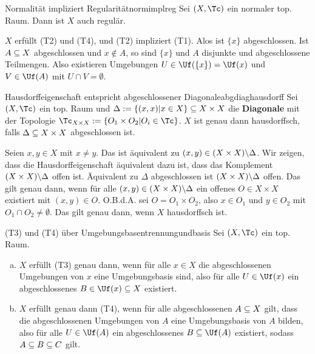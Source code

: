 \begin{satz}{Normalität impliziert Regularität}{normimplreg}
Sei $(X, \Tc)$ ein normaler top. Raum. Dann ist $X$ auch regulär.
\end{satz}
\begin{beweis}
$X$ erfüllt (T2) und (T4), und (T2) impliziert (T1). Alos ist $\{x\}$ abgeschlossen. Ist $A \subseteq X$ abgeschlossen und $x \notin A$, so sind $\{x\}$ und $A$ disjunkte und abgeschlossene Teilmengen. Also existieren Umgebungen $U \in \Uf(\{x\}) = \Uf(x)$ und $V \in \Uf(A)$ mit $U \cap V = \emptyset$.
\end{beweis}
\begin{satz}{Hausdorffeigenschaft entspricht abgeschlossener Diagonale}{abgdiaghausdorff}
Sei $(X, \Tc)$ ein top. Raum und $\Delta:= \{(x,x)|x \in X\} \subseteq X \times X$ die \textbf{Diagonale} mit der Topologie $\Tc_{X \times X} := \{O_1 \times O_2 | O_i \in \Tc\}$. $X$ ist genau dann hausdorffsch, falls $\Delta \subseteq X \times X$ abgeschlossen ist.
\end{satz}
\begin{beweis}
Seien $x, y \in X$ mit $x \neq y$. Das ist äquivalent zu $(x,y) \in (X \times X) \backslash \Delta$. Wir zeigen, dass die Hausdorffeigenschaft äquivalent dazu ist, dass das Komplement $(X \times X) \backslash \Delta$ offen ist. Äquivalent zu $\Delta$ abgeschlossen ist $(X \times X) \backslash \Delta$ offen. Das gilt genau dann, wenn für alle $(x,y) \in (X \times X) \backslash \Delta$ ein offenes $O \in X \times X$ existiert mit $(x,y)\in O$. O.B.d.A. sei $O = O_1 \times O_2$, also $x \in O_1$ und $y \in O_2$ mit $O_1 \cap O_2 \neq \emptyset$. Das gilt genau dann, wenn $X$ hausdorffsch ist.
\end{beweis}
\begin{satz}{(T3) und (T4) über Umgebungsbasen}{trennungundbasis}
Sei $(X,\Tc)$ ein top. Raum.
\begin{enumerate}[(a)]
\item $X$ erfüllt (T3) genau dann, wenn für alle $x \in X$ die abgeschlossenen Umgebungen von $x$ eine Umgebungsbasis sind, also für alle $U \in \Uf(x)$ ein abgeschlossenes $B \in \Uf(x) \sub X$  existiert.
\item $X$ erfüllt genau dann (T4), wenn für alle abgeschlossenen $A \subseteq X$ gilt, dass die abgeschlossenen Umgebungen von $A$ eine Umgebungsbasis von $A$ bilden, also für alle $U \in \Uf(A)$ ein abgeschlossenes $B \sub \Uf(A)$ existiert, sodass $A \subseteq B \subseteq C$ gilt.
\end{enumerate}
\end{satz}

